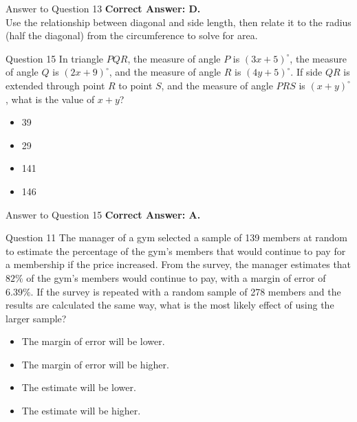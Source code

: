 \documentclass{beamer}
\begin{document}
\begin{frame}{Answer to Question 13}
\textbf{Correct Answer: D.} \\
Use the relationship between diagonal and side length, then relate it to the radius (half the diagonal) from the circumference to solve for area.
\end{frame}

\newpage

\begin{frame}{Question 15}
In triangle $PQR$, the measure of angle $P$ is $(3x + 5)^\circ$, the measure of angle $Q$ is $(2x + 9)^\circ$, and the measure of angle $R$ is $(4y + 5)^\circ$.  
If side $QR$ is extended through point $R$ to point $S$, and the measure of angle $PRS$ is $(x + y)^\circ$, what is the value of $x + y$?

\begin{itemize}
    \item[A.] 39
    \item[B.] 29
    \item[C.] 141
    \item[D.] 146
\end{itemize}
\end{frame}

\begin{frame}{Answer to Question 15}
\textbf{Correct Answer: A.}  
\end{frame}


\begin{frame}{Question 11}
The manager of a gym selected a sample of 139 members at random to estimate the percentage of the gym's members that would continue to pay for a membership if the price increased.  
From the survey, the manager estimates that $82\%$ of the gym's members would continue to pay, with a margin of error of $6.39\%$.  
If the survey is repeated with a random sample of 278 members and the results are calculated the same way, what is the most likely effect of using the larger sample?

\begin{itemize}
    \item[A.] The margin of error will be lower.
    \item[B.] The margin of error will be higher.
    \item[C.] The estimate will be lower.
    \item[D.] The estimate will be higher.
\end{itemize}
\end{frame}
\end{document}
